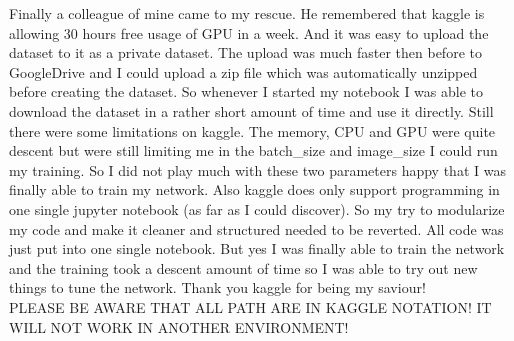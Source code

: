 \documentclass[]{article}
\begin{document}
Finally a colleague of mine came to my rescue. He remembered that kaggle is allowing 30 hours free usage of GPU in a week. And it was easy to upload the dataset to it as a private dataset. The upload was much faster then before to GoogleDrive and I could upload a zip file which was automatically unzipped before creating the dataset. So whenever I started my notebook I was able to download the dataset in a rather short amount of time and use it directly. Still there were some limitations on kaggle. The memory, CPU and GPU were quite descent but were still limiting me in the batch\_size and image\_size I could run my training. So I did not play much with these two parameters happy that I was finally able to train my network. Also kaggle does only support programming in one single jupyter notebook (as far as I could discover). So my try to modularize my code and make it cleaner and structured needed to be reverted. All code was just put into one single notebook. But yes I was finally able to train the network and the training took a descent amount of time so I was able to try out new things to tune the network. Thank you kaggle for being my saviour!\\
PLEASE BE AWARE THAT ALL PATH ARE IN KAGGLE NOTATION! IT WILL NOT WORK IN ANOTHER ENVIRONMENT!
\end{document}

